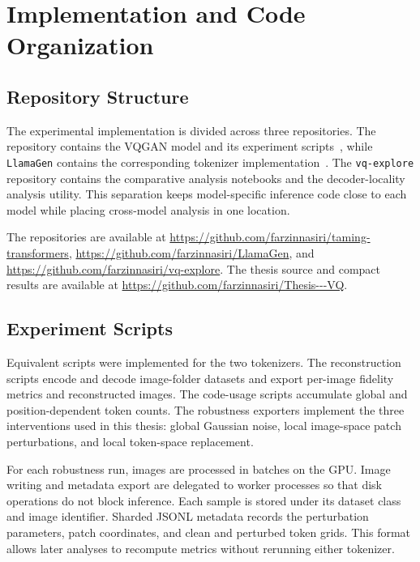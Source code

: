 \chapter{Implementation and Code Organization}
\label{app:implementation_code_organization}

\section{Repository Structure}
\label{sec:appendix_repositories}

The experimental implementation is divided across three repositories. The
 repository contains the VQGAN model and its
experiment scripts~\cite{tamingtransformersgithub}, while \texttt{LlamaGen}
contains the corresponding tokenizer implementation~\cite{llamagengithub}.
The \texttt{vq-explore} repository contains the
comparative analysis notebooks and the decoder-locality analysis utility. This
separation keeps model-specific inference code close to each model while
placing cross-model analysis in one location.

The repositories are available at
\url{https://github.com/farzinnasiri/taming-transformers},
\url{https://github.com/farzinnasiri/LlamaGen}, and
\url{https://github.com/farzinnasiri/vq-explore}.
The thesis source and compact results are available at
\url{https://github.com/farzinnasiri/Thesis---VQ}.

\section{Experiment Scripts}
\label{sec:appendix_experiment_scripts}

Equivalent scripts were implemented for the two tokenizers. The reconstruction
scripts encode and decode image-folder datasets and export per-image fidelity
metrics and reconstructed images. The code-usage scripts accumulate global and
position-dependent token counts. The robustness exporters implement the three
interventions used in this thesis: global Gaussian noise, local image-space
patch perturbations, and local token-space replacement.

For each robustness run, images are processed in batches on the GPU. Image
writing and metadata export are delegated to worker processes so that disk
operations do not block inference. Each sample is stored under its dataset
class and image identifier. Sharded JSONL metadata records the perturbation
parameters, patch coordinates, and clean and perturbed token grids. This format
allows later analyses to recompute metrics without rerunning either tokenizer.

